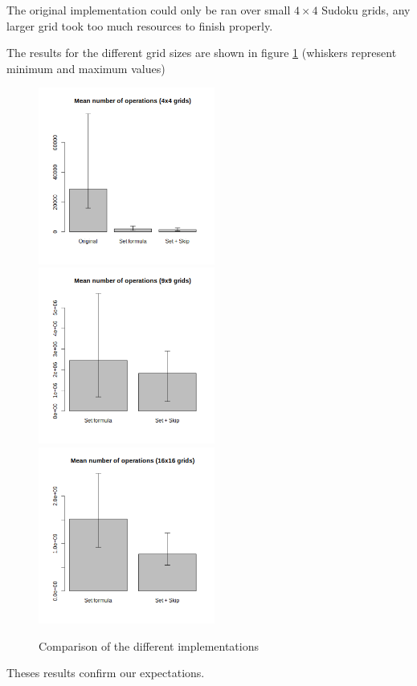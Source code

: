 \documentclass[a4paper,11pt]{report}
\begin{document}
The original implementation could only be ran over small $4 \times 4$ Sudoku grids, any larger grid took too much resources to finish properly.

The results for the different grid sizes are shown in figure \ref{fig:resimpl} (whiskers represent minimum and maximum values)

\begin{figure}[!ht]
    \centering
    \includegraphics[width=5.8cm]{../Test/results/impl_2_op.png}%
    \includegraphics[width=5.8cm]{../Test/results/impl_3_op.png}%
    \includegraphics[width=5.8cm]{../Test/results/impl_4_op.png}
    \caption{Comparison of the different implementations}
    \label{fig:resimpl}
\end{figure}

Theses results confirm our expectations.
\end{document}
